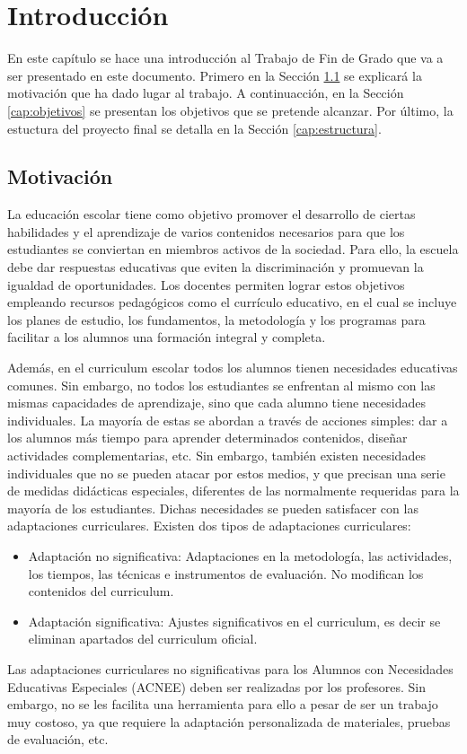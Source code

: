 \chapter{Introducción}
\label{ch:introduccion}

En este capítulo se hace una introducción al Trabajo de Fin de Grado que va a ser presentado en este documento. Primero en la Sección \ref{cap:motivacio} se explicará la motivación que ha dado lugar al trabajo. A continuacción, en la Sección \ref{cap:objetivos} se presentan los objetivos que se pretende alcanzar. Por último, la estuctura del proyecto final se detalla en la Sección \ref{cap:estructura}.

\section{Motivación}\label{cap:motivacio}
La educación escolar tiene como objetivo promover el desarrollo de ciertas habilidades y el aprendizaje de varios contenidos necesarios para que los estudiantes se conviertan en miembros activos de la sociedad. Para ello, la escuela debe dar respuestas educativas que eviten la discriminación y promuevan la igualdad de oportunidades. Los docentes permiten lograr estos objetivos empleando recursos pedagógicos como el currículo educativo, en el cual se incluye los planes de estudio, los fundamentos, la metodología y los programas para facilitar a los alumnos una formación integral y completa.

Además, en el curriculum escolar todos los alumnos tienen necesidades educativas comunes. Sin embargo, no todos los estudiantes se enfrentan al mismo con las mismas capacidades de aprendizaje, sino que cada alumno tiene necesidades individuales. La mayoría de estas se abordan a través de acciones simples: dar a los alumnos más tiempo para aprender determinados contenidos, diseñar actividades complementarias, etc.  Sin embargo, también existen necesidades individuales que no se pueden atacar por estos medios, y que precisan una serie de medidas didácticas especiales, diferentes de las normalmente requeridas para la mayoría de los estudiantes. Dichas necesidades se pueden satisfacer con las adaptaciones curriculares. Existen dos tipos de adaptaciones curriculares:
\begin{itemize}
    \item Adaptación no significativa: Adaptaciones en la metodología, las actividades, los tiempos, las técnicas e instrumentos de evaluación. No modifican los contenidos del curriculum.  
    \item Adaptación significativa: Ajustes significativos en el curriculum, es decir se eliminan apartados del curriculum oficial. 
\end{itemize}
Las adaptaciones curriculares no significativas para los Alumnos con Necesidades Educativas Especiales (ACNEE) deben ser realizadas por los profesores. Sin embargo, no se les facilita una herramienta para ello a pesar de ser un trabajo muy costoso, ya que requiere la adaptación personalizada de materiales, pruebas de evaluación, etc.

